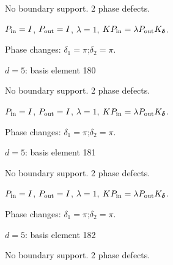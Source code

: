 No boundary support. 2 phase defects.
\begin{center}
\end{center}
\vspace{-1mm}
$P_{\rm in}=I$, \quad $P_{\rm out}=I$, \quad $\lambda=1$, \qquad $K P_{\rm in}=\lambda P_{\rm out}K_{\boldsymbol\delta}$.
\par\smallskip\begin{minipage}{.98\linewidth}\small Phase changes: $\delta_{1}=\pi$;\quad $\delta_{2}=\pi$.\end{minipage}
\vfill
{\footnotesize\texttt{}}
\newpage
{}
{\Large $d=5$: basis element 180}\par
No boundary support. 2 phase defects.
\begin{center}
\end{center}
\vspace{-1mm}
$P_{\rm in}=I$, \quad $P_{\rm out}=I$, \quad $\lambda=1$, \qquad $K P_{\rm in}=\lambda P_{\rm out}K_{\boldsymbol\delta}$.
\par\smallskip\begin{minipage}{.98\linewidth}\small Phase changes: $\delta_{1}=\pi$;\quad $\delta_{2}=\pi$.\end{minipage}
\vfill
{\footnotesize\texttt{}}
\newpage
{}
{\Large $d=5$: basis element 181}\par
No boundary support. 2 phase defects.
\begin{center}
\end{center}
\vspace{-1mm}
$P_{\rm in}=I$, \quad $P_{\rm out}=I$, \quad $\lambda=1$, \qquad $K P_{\rm in}=\lambda P_{\rm out}K_{\boldsymbol\delta}$.
\par\smallskip\begin{minipage}{.98\linewidth}\small Phase changes: $\delta_{1}=\pi$;\quad $\delta_{2}=\pi$.\end{minipage}
\vfill
{\footnotesize\texttt{}}
\newpage
{}
{\Large $d=5$: basis element 182}\par
No boundary support. 2 phase defects.
\begin{center}
\end{center}
